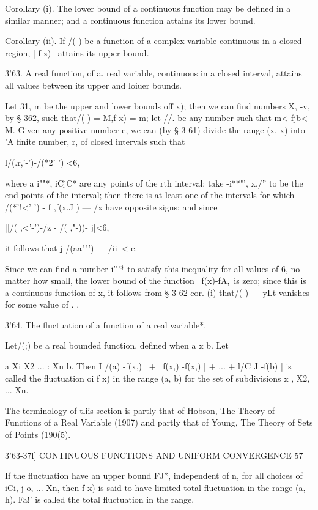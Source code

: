 Corollary (i). The lower bound of a continuous function may be defined
in a similar manner; and a continuous function attains its lower
bound.

Corollary (ii). If /( ) be a function of a complex variable continuous
in a closed region, | f z) \ attains its upper bound.

3'63. A real function, of a. real variable, continuous in a closed
interval, attains all values between its upper and loiuer bounds.

Let 31, m be the upper and lower bounds off x); then we can find
numbers X, -v, by § 362, such that/( ) = M,f x) = m; let //. be any
number such that m< fjb< M. Given any positive number e, we can (by §
3-61) divide the range (x, x) into 'A finite number, r, of closed
intervals such that

l/(.r,'-')-/(*2' ')|<6,

where a i""*, iCjC* are any points of the rth interval; take -i**"',
x./'' to be the end points of the interval; then there is at least
one of the intervals for which /(*'!<' ') - f ,f(x.J ) — /x have
opposite signs; and since

|[/( ,<'-')-/z - /( ,"-))- j|<6,

it follows that j /(aa""') — /ii\ < e.

Since we can find a number i'''* to satisfy this inequality for all
values of 6, no matter how small, the lower bound of the function \
f(x)-fA,\ is zero; since this is a continuous function of x, it
follows from § 3-62 cor. (i) that/( ) — yLt vanishes for some value of
. .

3'64. The fluctuation of a function of a real variable*.

Let/(;) be a real bounded function, defined when a x b. Let

a Xi X2 ... : Xn b. Then I /(a) -f(x,) \ + \ f(x,) -f(x,) | + ... +
l/C J -f(b) | is called the fluctuation oi f x) in the range (a, b)
for the set of subdivisions x , X2, ... Xn.

The terminology of tliis section is partly that of Hobson, The Theory
of Functions of a Real Variable (1907) and partly that of Young, The
Theory of Sets of Points (190(5).



3'63-37l] CONTINUOUS FUNCTIONS AND UNIFORM CONVERGENCE 57

If the fluctuation have an upper bound FJ*, independent of n, for all
choices of iCi, j-o, ... Xn, then f x) is said to have limited total
fluctuation in the range (a, h). Fa!' is called the total fluctuation
in the range.

